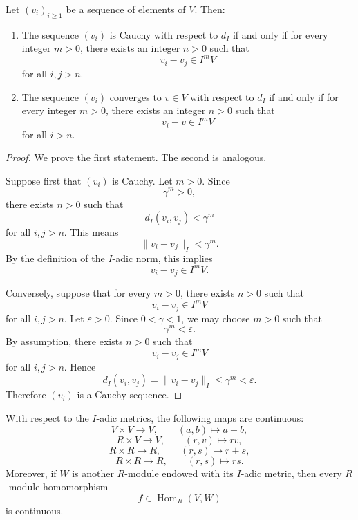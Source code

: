 \begin{proposition}
    Let \((v_i)_{i\geq 1}\) be a sequence of elements of \(V\).
    Then:
    \begin{enumerate}
        \item The sequence \((v_i)\) is Cauchy with respect to \(d_I\) if and only if
        for every integer \(m>0\), there exists an integer \(n>0\) such that
        \[
            v_i-v_j\in I^mV
        \]
        for all \(i,j>n\).

        \item The sequence \((v_i)\) converges to \(v\in V\) with respect to \(d_I\) if
        and only if for every integer \(m>0\), there exists an integer \(n>0\) such that
        \[
            v_i-v\in I^mV
        \]
        for all \(i>n\).
    \end{enumerate}
\end{proposition}

\begin{proof}
    We prove the first statement. The second is analogous.

    Suppose first that \((v_i)\) is Cauchy. Let \(m>0\). Since
    \[
        \gamma^m>0,
    \]
    there exists \(n>0\) such that
    \[
        d_I(v_i,v_j)<\gamma^m
    \]
    for all \(i,j>n\). This means
    \[
        \|v_i-v_j\|_I<\gamma^m.
    \]
    By the definition of the \(I\)-adic norm, this implies
    \[
        v_i-v_j\in I^mV.
    \]

    Conversely, suppose that for every \(m>0\), there exists \(n>0\) such that
    \[
        v_i-v_j\in I^mV
    \]
    for all \(i,j>n\). Let \(\varepsilon>0\). Since \(0<\gamma<1\), we may choose
    \(m>0\) such that
    \[
        \gamma^m<\varepsilon.
    \]
    By assumption, there exists \(n>0\) such that
    \[
        v_i-v_j\in I^mV
    \]
    for all \(i,j>n\). Hence
    \[
        d_I(v_i,v_j)=\|v_i-v_j\|_I\leq \gamma^m<\varepsilon.
    \]
    Therefore \((v_i)\) is a Cauchy sequence.
\end{proof}

\begin{lemma}
    With respect to the \(I\)-adic metrics, the following maps are continuous:
    \[
        V\times V \longrightarrow V,
        \qquad
        (a,b)\longmapsto a+b,
    \]
    \[
        R\times V \longrightarrow V,
        \qquad
        (r,v)\longmapsto rv,
    \]
    \[
        R\times R \longrightarrow R,
        \qquad
        (r,s)\longmapsto r+s,
    \]
    \[
        R\times R \longrightarrow R,
        \qquad
        (r,s)\longmapsto rs.
    \]
    Moreover, if \(W\) is another \(R\)-module endowed with its \(I\)-adic metric, then
    every \(R\)-module homomorphism
    \[
        f\in \operatorname{Hom}_R(V,W)
    \]
    is continuous.
\end{lemma}

